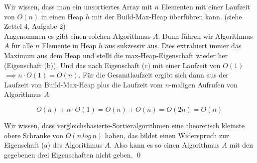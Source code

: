 \documentclass[ngerman,landscape,twocolumn]{adtexsheet}
\begin{document}
Wir wissen, dass man ein unsortiertes Array mit $n$  Elementen mit einer Laufzeit von $O(n)$ in einen Heap $h$ mit der Build-Max-Heap überführen kann. (siehe Zettel 4, Aufgabe 2)\\
Angenommen es gibt einen solchen Algorithmus $A$. Dann führen wir Algorithmus $A$ für alle $n$ Elemente in Heap $h$ aus sukzessiv aus. Dies extrahiert immer das Maximum aus dem Heap und stellt die max-Heap-Eigenschaft wieder her (Eigenschaft (b)). Und das nach Eigenschaft (c) mit einer Laufzeit von $O(1)$ $\implies n \cdot O(1) = O(n)$. Für die Gesamtlaufzeit ergibt sich dann aus der Laufzeit von Build-Max-Heap plus die Laufzeit vom $n$-maligen Aufrufen von Algorithmus $A$ 

$$O(n) + n \cdot O(1) = O(n) +O(n) = O(2n) = O(n)$$

Wir wissen, dass vergleichsbasierte-Sortieralgorithmen eine theoretisch kleinste obere Schranke von $O(n\,log\,n)$ haben, das bildet einen Widerspruch zur Eigenschaft (a) des Algorithmus $A$. Also kann es so einen Algorithmus $A$ mit den gegebenen drei Eigenschaften nicht geben. \qed
\end{document}
